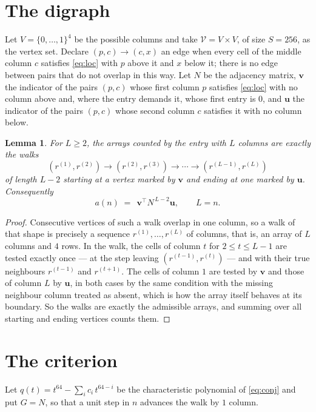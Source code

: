 \documentclass[11pt,a4paper]{article}
\theoremstyle{plain}
\newtheorem{lemma}[theorem]{Lemma}
\theoremstyle{definition}
\begin{document}
\section{The digraph}

Let $V=\{0,\dots,1\}^{4}$ be the possible columns and take
$\mathcal V=V\times V$, of size $S=256$, as the vertex set. Declare $(p,c)\to(c,x)$ an edge
when every cell of the middle column $c$ satisfies \eqref{eq:loc} with $p$ above it and $x$
below it; there is no edge between pairs that do not overlap in this way. Let $N$ be the
adjacency matrix, $\mathbf{v}$ the indicator of the pairs $(p,c)$ whose first column $p$
satisfies \eqref{eq:loc} with no column above and, where the entry demands it, whose first entry is $0$, and $\mathbf{u}$ the indicator of
the pairs $(p,c)$ whose second column $c$ satisfies it with no column below.

\begin{lemma}\label{lem:walk}
For $L\ge2$, the arrays counted by the entry with $L$ columns are exactly the walks
\[
(r^{(1)},r^{(2)})\to(r^{(2)},r^{(3)})\to\cdots\to(r^{(L-1)},r^{(L)})
\]
of length $L-2$ starting at a vertex marked by $\mathbf{v}$ and ending at one marked by
$\mathbf{u}$. Consequently
\[
a(n)\;=\;\,\mathbf{v}^{\!\top}N^{\,L-2}\mathbf{u},\qquad L=n .
\]
\end{lemma}

\begin{proof}
Consecutive vertices of such a walk overlap in one column, so a walk of that shape is
precisely a sequence $r^{(1)},\dots,r^{(L)}$ of columns, that is, an array of $L$ columns
and $4$ rows. In the walk, the cells of column $t$ for $2\le t\le L-1$ are tested
exactly once --- at the step leaving $(r^{(t-1)},r^{(t)})$ --- and with their true
neighbours $r^{(t-1)}$ and $r^{(t+1)}$. The cells of column $1$ are tested by
$\mathbf{v}$ and those of column $L$ by $\mathbf{u}$, in both cases by the same condition
with the missing neighbour column treated as absent, which is how the array itself behaves at
its boundary. So the walks are exactly the admissible arrays, and summing over all starting
and ending vertices counts them.
\end{proof}

\section{The criterion}

Let $q(t)=t^{64}-\sum_i c_i\,t^{64-i}$ be the characteristic polynomial of
\eqref{eq:conj} and put $G=N$, so that a unit step in $n$ advances the walk by
$1$ column.
\end{document}
